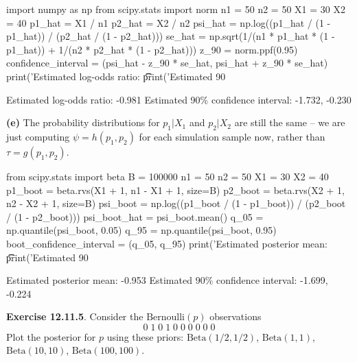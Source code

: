 \begin{python}
import numpy as np
from scipy.stats import norm
n1 = 50
n2 = 50
X1 = 30
X2 = 40
p1_hat = X1 / n1
p2_hat = X2 / n2
psi_hat = np.log((p1_hat / (1 - p1_hat)) / (p2_hat / (1 - p2_hat)))
se_hat = np.sqrt(1/(n1 * p1_hat * (1 - p1_hat)) + 1/(n2 * p2_hat * (1 - p2_hat)))
z_90 = norm.ppf(0.95)
confidence_interval = (psi_hat - z_90 * se_hat, psi_hat + z_90 * se_hat)
print('Estimated log-odds ratio: \t\t %
print('Estimated 90%
\end{python}
\begin{console}
Estimated log-odds ratio:                -0.981
Estimated 90\% confidence interval:       -1.732, -0.230
\end{console}
\textbf{(e)} The probability distributions for \(p_{1} | X_{1}\) and
\(p_{2} | X_{2}\) are still the same -- we are just computing
\(\psi = h(p_{1}, p_{2})\) for each simulation sample now, rather than
\(\tau = g(p_{1}, p_{2})\).

\begin{python}
from scipy.stats import beta
B = 100000
n1 = 50
n2 = 50
X1 = 30
X2 = 40
p1_boot = beta.rvs(X1 + 1, n1 - X1 + 1, size=B)
p2_boot = beta.rvs(X2 + 1, n2 - X2 + 1, size=B)
psi_boot = np.log((p1_boot / (1 - p1_boot)) / (p2_boot / (1 - p2_boot)))
psi_boot_hat = psi_boot.mean()
q_05 = np.quantile(psi_boot, 0.05)
q_95 = np.quantile(psi_boot, 0.95)
boot_confidence_interval = (q_05, q_95)
print('Estimated posterior mean: \t\t %
print('Estimated 90%
\end{python}
\begin{console}
Estimated posterior mean:                -0.953
Estimated 90\% confidence interval:       -1.699, -0.224
\end{console}

\textbf{Exercise 12.11.5}. Consider the \(\text{Bernoulli}(p)\)
observations
\[
0\; 1\; 0\; 1\; 0\; 0\; 0\; 0\; 0\; 0
\]
Plot the posterior for \(p\) using these priors:
\(\text{Beta}(1/2, 1/2)\), \(\text{Beta}(1, 1)\),
\(\text{Beta}(10, 10)\), \(\text{Beta}(100, 100)\).

